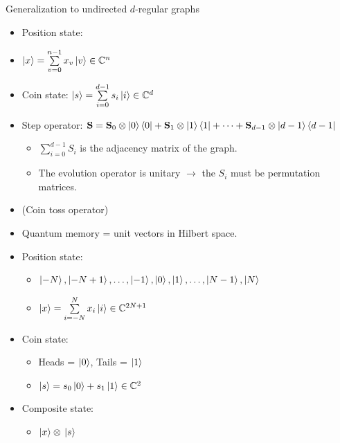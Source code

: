 \documentclass[aspectratio=169]{beamer}
\begin{document}
\begin{frame}{Generalization to undirected $d$-regular graphs}
\begin{itemize}
    \item Position state: \item $\ket{x} = \sum\limits_{v=0}^{n-1}x_v\ket{v} \in{} \mathbb{C}^{n}$ \pause
    \item Coin state: $\ket{s} = \sum\limits_{i=0}^{d-1}s_i\ket{i} \in{} \mathbb{C}^{d}$
    \item Step operator: $\mathbf{S} = \mathbf{S}_0\otimes \ket{0}\bra{0} + \mathbf{S}_1 \otimes\ket{1}\bra{1} + \dots + \mathbf{S}_{d-1}\otimes \ket{d-1}\bra{d-1}$
    \begin{itemize}
        \item $\sum\limits_{i=0}^{d-1}S_i$ is the adjacency matrix of the graph.
        \item The evolution operator is unitary $\rightarrow$ the $S_i$ must be permutation matrices.
    \end{itemize}
    \item (Coin toss operator)
\end{itemize}


\begin{itemize}
    \item Quantum memory = unit vectors in Hilbert space. \pause
    \item Position state: \pause
    \begin{itemize}
        \item $\ket{-N},\ket{-N+1},\dots,\ket{-1},\ket{0},\ket{1},\dots,\ket{N-1},\ket{N}$ \pause
        \item $\ket{x} = \sum\limits_{i=-N}^{N}x_i\ket{i} \in{} \mathbb{C}^{2N+1}$ \pause
    \end{itemize}
    \item Coin state: \pause
    \begin{itemize}
        \item Heads = $\ket{0}$, Tails = $\ket{1}$ \pause
        \item $\ket{s} = s_0 \ket{0} + s_1 \ket{1} \in \mathbb{C}^2$ \pause
    \end{itemize}
    \item Composite state: \pause
    \begin{itemize}
        \item $\ket{x}\otimes{}\ket{s}$
    \end{itemize}
\end{itemize}
\end{frame}
\end{document}
